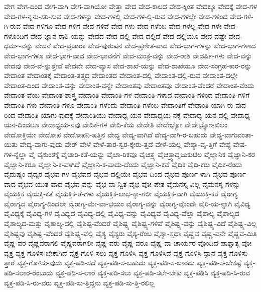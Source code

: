{ವೇಗ
ವೇಗ-ದಿಂದ
ವೇಗ-ವಾಗಿ
ವೇಗ-ವಾಗಿಯೋ
ವೇತ್ತಾ
ವೇದ
ವೇದ-ಕಾಲದ
ವೇದ-ಕ್ಕಿಂತ
ವೇದಕ್ಕೂ
ವೇದಕ್ಕೆ
ವೇದ-ಗಳ
ವೇದ-ಗಳ-ನ್ನನು-ಸರಿ-ಸುವ
ವೇದ-ಗಳನ್ನು
ವೇದ-ಗಳಲ್ಲಿ
ವೇದ-ಗಳ-ಲ್ಲಿ-ರುವ
ವೇದ-ಗಳಲ್ಲೇ
ವೇದ-ಗಳಿಂದ
ವೇದ-ಗಳಿ-ಗಿ-ರುವ
ವೇದ-ಗಳಿಗೂ
ವೇದ-ಗಳಿಗೆ
ವೇದ-ಗಳಿವೆ
ವೇದ-ಗಳು
ವೇದ-ಗಳೆಂಬ
ವೇದ-ಗಳೆಲ್ಲ
ವೇದ-ಗಳೇ
ವೇದ-ಗಳೊಂದಿಗೆ
ವೇದ-ಜ್ಞಾನ-ರಾಶಿ-ಯನ್ನು
ವೇದದ
ವೇದ-ದಲ್ಲಿ
ವೇದ-ದಲ್ಲಿದೆ
ವೇದ-ದಲ್ಲಿಯೂ
ವೇದ-ದಷ್ಟೇ
ವೇದ-ಧರ್ಮ-ವನ್ನು
ವೇದನೆ
ವೇದ-ಪ್ರಚಾರಕ
ವೇದ-ಪುರುಷನ
ವೇದ-ಪ್ರಣೀತ-ವಾದ
ವೇದ-ಭಾಗ-ಗಳನ್ನು
ವೇದ-ಭಾಗ-ಗಳಾದ
ವೇದ-ಭಾಗ-ಗಳೂ
ವೇದ-ಭಾಗ-ವಾದ
ವೇದ-ಭಾವನೆಗೆ
ವೇದ-ಮಂತ್ರ-ವನ್ನು
ವೇದ-ರಾಶಿ
ವೇದರ್ಷಿ-ಗಳು
ವೇದ-ವನ್ನು
ವೇದವು
ವೇದ-ವೆ-ನ್ನುತ್ತೇವೆ
ವೇದವೇ
ವೇದ-ವ್ಯಾಸ
ವೇದ-ಶಾಖೆ-ಯನ್ನು
ವೇದ-ಶಾಖೆಯೂ
ವೇದ-ಸಂಗ್ರಹ-ಕಾರ-ರನ್ನು
ವೇದಾಂತ
ವೇದಾಂತಕ್ಕೆ
ವೇದಾಂತ-ತತ್ತ್ವದ
ವೇದಾಂತದ
ವೇದಾಂತ-ದಲ್ಲಿ
ವೇದಾಂತ-ದಲ್ಲಿ-ರುವ
ವೇದಾಂತ-ದಲ್ಲೇ
ವೇದಾಂತ-ದಿಂದ
ವೇದಾಂತ-ವನ್ನು
ವೇದಾಂತ-ವನ್ನೇ
ವೇದಾಂತವು
ವೇದಾಂತವೂ
ವೇದಾಂತ-ವೆಂದರೆ
ವೇದಾಂತ-ವೆಂದು
ವೇದಾಂತ-ವೆಂಬ
ವೇದಾಂತ-ಶಾಸ್ತ್ರ
ವೇದಾಂತಿ
ವೇದಾಂತಿ-ಗಳ
ವೇದಾಂತಿ-ಗಳಾದ
ವೇದಾಂತಿ-ಗಳಿಂದ
ವೇದಾಂತಿ-ಗಳಿಗೆ
ವೇದಾಂತಿ-ಗಳು
ವೇದಾಂತಿ-ಗಳೂ
ವೇದಾಂತಿ-ಗಳೆಂದು
ವೇದಾಂತಿ-ಗಳೆಂಬ
ವೇದಾಂತಿಗೆ
ವೇದಾಂತಿ-ಯಾಗಿ-ರು-ವುದ-ರಿಂದ
ವೇದಾಂತಿ-ಯಾಗು-ವುದಕ್ಕೆ
ವೇದಾಂತಿಯು
ವೇದಾಧ್ಯ-ಯನ
ವೇದಾಧ್ಯಯ-ನಕ್ಕೆ
ವೇದಾಧ್ಯ-ಯನ-ದಲ್ಲಿ
ವೇದಾಧ್ಯ-ಯನ-ದಿಂದಲೂ
ವೇದಾಧ್ಯಯ-ನವು
ವೇದಿಕೆ-ಗಳ
ವೇದಿ-ಕೆಯ
ವೇದೇತಿ
ವೇದೇಭ್ಯೋ
ವೇದೇಭ್ಯೋಽಖಿಲಂ
ವೇದೋಕ್ತಿಯೇ
ವೇದೋಪ
ವೇದೋಪನಿ-ಷತ್ತಿನ
ವೇದ್ಯ
ವೇದ್ಯ-ವಾಗಿದೆ
ವೇದ್ಯ-ವಾಗಿ-ರ-ಬಹುದು
ವೇದ್ಯ-ವಾಗುವಂತಾ-ಯಿತು
ವೇದ್ಯ-ವಾಗು-ವುದು
ವೇರ್
ವೇಳೆ
ವೇಳೆ-ತಾರ-ಸ್ವರ-ಕ್ಕೇರು-ತ್ತದೆ
ವೇಳೆ-ಯಲ್ಲ
ವೇಶ್ಯಾ-ವೃ-ತ್ತಿಗೆ
ವೇಶ್ಯೆ
ವೇಷ-ಗಳ-ನ್ನೆಲ್ಲಾ
ವೈ
ವೈಕುಂಠಕ್ಕೆ
ವೈಚಾರಿ-ಕತೆ-ಯನ್ನು
ವೈಚಾ-ರಿಕವೂ
ವೈಚಿತ್ರ್ಯ
ವೈಚಿತ್ರ್ಯಾದೃಜುಕುಟಿಲ
ವೈಜ್ಞಾನಿಕ
ವೈಜ್ಞಾನಿ-ಕರ
ವೈಜ್ಞಾನಿ-ಕರೂ
ವೈಜ್ಞಾನಿ-ಕ-ವಾಗಿದೆ
ವೈಜ್ಞಾನಿ-ಕ-ವಾದು-ದೆಂದು
ವೈಜ್ಞಾನಿ-ಕವೆ
ವೈದಿಕ
ವೈದಿ-ಕರು
ವೈದಿಕ-ರೆಂದು
ವೈದುಷ್ಯಂ
ವೈದ್ಯರ
ವೈಭವ-ಗಳ
ವೈಭವದ
ವೈಭವ-ದಲ್ಲಿಯೇ
ವೈಭವ-ದಿಂದ
ವೈಭವ-ಪೂರ್ಣ-ಳಾಗಿ
ವೈಭವ-ಪೂರ್ಣ-ವಾದ
ವೈಭವ-ಯುತ-ವಾದ
ವೈಭವ-ವನ್ನು
ವೈಭ-ವಾ-ನ್ವಿತ
ವೈಭ-ವೋ-ಪೇತ
ವೈಮನಸ್ಯ-ವಿಲ್ಲ
ವೈಮನಸ್ಯ-ಗಳನ್ನು
ವೈಯಕ್ತಿಕ
ವೈಯಕ್ತಿ-ಕತೆ
ವೈಯಕ್ತಿಕ-ತೆ-ಗಳು
ವೈಯಕ್ತಿಕ-ಲಾಭ-ಕ್ಕಾ-ಗಲೀ
ವೈಯಕ್ತಿಕ-ವಾಗಿ
ವೈಯುಕ್ತಿ-ಕತೆ
ವೈರಾಗ್ಯ
ವೈರಾಗ್ಯದ
ವೈರಾಗ್ಯ-ದಿಂದಲೇ
ವೈರಾಗ್ಯ-ಮೇ-ವಾ-ಭಯಂ
ವೈರಾಗ್ಯ-ವನ್ನು
ವೈರಾಗ್ಯ-ವೊಂದೇ
ವೈರಿ-ಯ-ನ್ನಾಗಿ
ವೈವಿಧ್ಯ
ವೈವಿಧ್ಯಕ್ಕೆ
ವೈವಿಧ್ಯ-ಗಳ
ವೈವಿಧ್ಯದ
ವೈವಿಧ್ಯ-ದಲ್ಲಿ
ವೈವಿಧ್ಯ-ವನ್ನು
ವೈವಿಧ್ಯವೆ
ವೈವಿಧ್ಯ-ವೆಲ್ಲಾ
ವೈಶಾಲ್ಯ
ವೈಶಾಲ್ಯದ
ವೈಶಾಲ್ಯದ-ಮತ್ತು
ವೈಶಾಲ್ಯ-ದಲ್ಲಿ
ವೈಶಿಷ್ಟ-ವೆಂದರೆ
ವೈಶಿಷ್ಟ್ಯ
ವೈಶಿಷ್ಟ್ಯ-ಗಳಿವೆ
ವೈಶಿಷ್ಟ್ಯ-ವನ್ನು
ವೈಶಿಷ್ಟ್ಯ-ವಿದೆ
ವೈಶಿಷ್ಟ್ಯ-ವಿಲ್ಲ
ವೈಶಿಷ್ಟ್ಯವು
ವೈಶಿಷ್ಟ್ಯ-ವೆಂದರೆ
ವೈಶಿಷ್ಟ್ಯ-ವೆಲ್ಲಿ
ವೈಶ್ಯ
ವೈಶ್ಯರು
ವೈಶ್ಯ-ರೆಂಬ
ವೈಶ್ಯಾ-ಸ್ತಥಾ
ವೈಷ್ಣವ
ವೈಷ್ಣ-ವನೇ
ವೈಷ್ಣವ-ಮಿತಿ
ವೈಷ್ಣ-ವರ
ವೈಷ್ಣವರಾಗಲಿ
ವೈಷ್ಣವರಾಗಲೀ
ವೈಷ್ಣ-ವರು
ವೈಷ್ಣ-ವರೂ
ವೈಷ್ಣ-ವಾ-ಚಾರ್ಯರ
ವೊಂದಿದೆ-ಪಾಶ್ಚಾತ್ಯ
ವೋ
ವ್ಯಕ್ತ
ವ್ಯಕ್ತ-ಗೊಳಿಸ-ಬೇಕಾಗಿದೆ
ವ್ಯಕ್ತ-ಗೊಳಿ-ಸಲು
ವ್ಯಕ್ತ-ಗೊಳಿಸಿ
ವ್ಯಕ್ತ-ಗೊಳಿಸಿದೆ
ವ್ಯಕ್ತ-ಗೊಳಿಸಿ-ದ್ದಾನೆ
ವ್ಯಕ್ತ-ಗೊಳಿಸು-ತ್ತಾರೆ
ವ್ಯಕ್ತ-ಗೊಳಿಸು-ವುದು
ವ್ಯಕ್ತ-ಪಡಿ-ಸದೆ
ವ್ಯಕ್ತ-ಪಡಿ-ಸ-ಬಹುದು
ವ್ಯಕ್ತ-ಪಡಿ-ಸ-ಬಾರದು
ವ್ಯಕ್ತ-ಪಡಿ-ಸ-ಬೇಕಷ್ಟೆ
ವ್ಯಕ್ತ-ಪಡಿ-ಸಲಾರ-ರೆಂಬುದು
ವ್ಯಕ್ತ-ಪಡಿ-ಸ-ಲಾರೆ
ವ್ಯಕ್ತ-ಪಡಿ-ಸಲು
ವ್ಯಕ್ತ-ಪಡಿ-ಸಲೇ-ಬೇಕು
ವ್ಯಕ್ತ-ಪಡಿಸಿ
ವ್ಯಕ್ತ-ಪಡಿ-ಸಿ-ರುವ
ವ್ಯಕ್ತ-ಪಡಿ-ಸಿ-ರು-ವರು
ವ್ಯಕ್ತ-ಪಡಿ-ಸು-ತ್ತಿದ್ದನು
ವ್ಯಕ್ತ-ಪಡಿ-ಸು-ತ್ತಿ-ರಲಿಲ್ಲ
}
